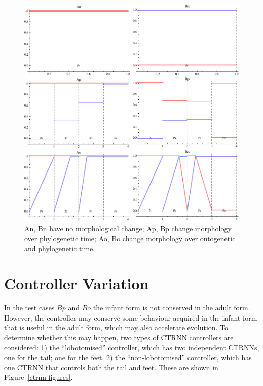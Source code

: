 \begin{figure}
  \centering
  \includegraphics[scale=1.0]{fig/morph-regiment.pdf} 
  \vspace{-15pt}
  \caption[Variations of morphological
    change]{\label{morph-regiment}An, Bn have no morphological change;
    Ap, Bp change morphology over phylogenetic time; Ao, Bo change
    morphology over ontogenetic and phylogenetic time.}

\end{figure}

\section{Controller Variation}

In the test cases $Bp$ and $Bo$ the infant form is not conserved in
the adult form.  However, the controller may conserve some behaviour
acquired in the infant form that is useful in the adult form, which
may also accelerate evolution.  To determine whether this may happen,
two types of CTRNN controllers are considered: 1) the ``lobotomised''
controller, which has two independent CTRNNs, one for the tail; one
for the feet. 2) the ``non-lobotomised'' controller, which has one
CTRNN that controls both the tail and feet.  These are shown in
Figure~\ref{ctrnn-figures}.

